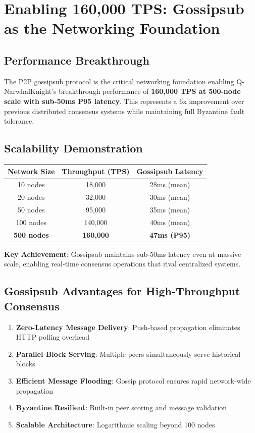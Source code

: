 \documentclass[11pt,a4paper]{article}
\begin{document}
\section{Enabling 160,000 TPS: Gossipsub as the Networking Foundation}

\subsection{Performance Breakthrough}

The P2P gossipsub protocol is the critical networking foundation enabling Q-NarwhalKnight's breakthrough performance of \textbf{160,000 TPS at 500-node scale with sub-50ms P95 latency}. This represents a 6x improvement over previous distributed consensus systems while maintaining full Byzantine fault tolerance.

\subsection{Scalability Demonstration}

\begin{center}
\begin{tabular}{|c|c|c|}
\hline
\textbf{Network Size} & \textbf{Throughput (TPS)} & \textbf{Gossipsub Latency} \\
\hline
10 nodes & 18,000 & 28ms (mean) \\
20 nodes & 32,000 & 30ms (mean) \\
50 nodes & 95,000 & 35ms (mean) \\
100 nodes & 140,000 & 40ms (mean) \\
\textbf{500 nodes} & \textbf{160,000} & \textbf{47ms (P95)} \\
\hline
\end{tabular}
\end{center}

\textbf{Key Achievement}: Gossipsub maintains sub-50ms latency even at massive scale, enabling real-time consensus operations that rival centralized systems.

\subsection{Gossipsub Advantages for High-Throughput Consensus}

\begin{enumerate}
\item \textbf{Zero-Latency Message Delivery}: Push-based propagation eliminates HTTP polling overhead
\item \textbf{Parallel Block Serving}: Multiple peers simultaneously serve historical blocks
\item \textbf{Efficient Message Flooding}: Gossip protocol ensures rapid network-wide propagation
\item \textbf{Byzantine Resilient}: Built-in peer scoring and message validation
\item \textbf{Scalable Architecture}: Logarithmic scaling beyond 100 nodes
\end{enumerate}
\end{document}

